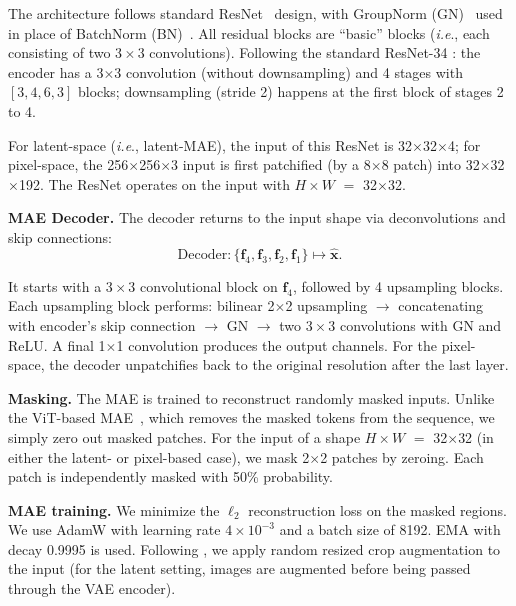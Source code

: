\documentclass{article}
\renewcommand{\paragraph}[1]{\vspace{.05em}\noindent\textbf{#1}}
\def\onedot{.}
\def\ie{\emph{i.e}\onedot} \def\Ie{\emph{I.e}\onedot}
\theoremstyle{plain}
\theoremstyle{definition}
\theoremstyle{remark}
\begin{document}
The architecture follows standard ResNet~\citep{he2016deep} design, with GroupNorm (GN)~\citep{wu2018group} used in place of BatchNorm (BN)~\citep{ioffe2015batch}.
All residual blocks are ``basic'' blocks (\ie, each consisting of two $3{\times}3$ convolutions).
Following the standard ResNet-34 \citep{he2016deep}:
the encoder has a 3${\times}$3 convolution (without downsampling) and 4 stages with $[3, 4, 6, 3]$ blocks; downsampling (stride 2) happens at the first block of stages 2 to 4.

For latent-space (\ie, latent-MAE), the input of this ResNet is 32$\times$32$\times$4; for pixel-space, the 256$\times$256$\times$3 input is first patchified (by a 8$\times$8 patch) into 32$\times$32$\times$192. The ResNet operates on the input with $H{\times}W$ $=$ 32$\times$32.

\paragraph{MAE Decoder.}
The decoder returns to the input shape via deconvolutions and skip connections:
\[
\text{Decoder}: \{\mathbf{f}_4, \mathbf{f}_3, \mathbf{f}_2, \mathbf{f}_1\} \mapsto \hat{\mathbf{x}}.
\]

It starts with a $3{\times}3$ convolutional block on $\mathbf{f}_4$, followed by 4 upsampling blocks.
Each upsampling block performs: bilinear 2${\times}$2 upsampling $\to$ concatenating with encoder's skip connection $\to$ GN $\to$ two $3{\times}3$ convolutions with GN and ReLU.
A final 1${\times}$1 convolution produces the output channels. For the pixel-space, the decoder unpatchifies back to the original resolution after the last layer.

\paragraph{Masking.}
The MAE is trained to reconstruct randomly masked inputs.
Unlike the ViT-based MAE~\citep{he2022masked}, which removes the masked tokens from the sequence, we simply zero out masked patches.
For the input of a shape $H{\times}W$ $=$ 32$\times$32 (in either the latent- or pixel-based case), we mask 2${\times}$2 patches by zeroing.
Each patch is independently masked with 50\% probability.

\paragraph{MAE training.}
We minimize the $\ell_2$ reconstruction loss on the masked regions.
We use AdamW \cite{Loshchilov2019} with learning rate $4{\times}10^{-3}$ and a batch size of 8192. EMA with decay 0.9995 is used.
Following \cite{he2022masked}, we apply random resized crop augmentation to the input (for the latent setting, images are augmented before being passed through the VAE encoder).
\end{document}
